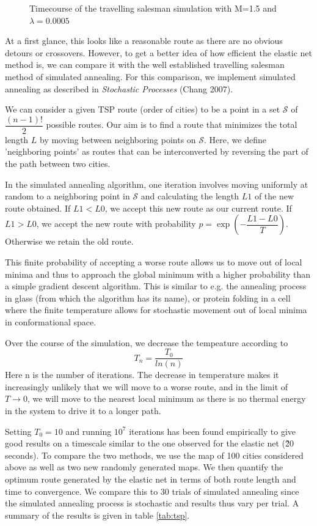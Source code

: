 \documentclass{article}
\begin{document}
\begin{figure}[h]
\begin{subfigure}[t]{0.24\linewidth}
		\label{fig:sim4}	
	\end{subfigure}%
\caption{Timecourse of the travelling salesman simulation with M=1.5 and $\lambda = 0.0005$}
\label{fig:tspsim}
\end{figure}

At a first glance, this looks like a reasonable route as there are no obvious detours or crossovers. However, to get a better idea of how efficient the elastic net method is, we can compare it with the well established travelling salesman method of simulated annealing. For this comparison, we implement simulated annealing as described in \textit{Stochastic Processes} (Chang 2007).

We can consider a given TSP route (order of cities) to be a point in a set $\mathcal{S}$ of $\dfrac{(n-1)!}{2}$ possible routes. Our aim is to find a route that minimizes the total length $L$ by moving between neighboring points on $\mathcal{S}$. Here, we define 'neighboring points' as routes that can be interconverted by reversing the part of the path between two cities.

In the simulated annealing algorithm, one iteration involves moving uniformly at random to a neighboring point in $\mathcal{S}$ and calculating the length $L1$ of the new route obtained.
If $L1 < L0$, we accept this new route as our current route.
If $L1 > L0$, we accept the new route with probability $p = \exp{(-\dfrac{L1-L0}{T})}$. Otherwise we retain the old route.

This finite probability of accepting a worse route allows us to move out of local minima and thus to approach the global minimum with a higher probability than a simple gradient descent algorithm. This is similar to e.g. the annealing process in glass (from which the algorithm has its name), or protein folding in a cell where the finite temperature allows for stochastic movement out of local minima in conformational space.

Over the course of the simulation, we decrease the tempeature according to 
\begin{equation}
T_n = \dfrac{T_0}{ln(n)}
\end{equation}
Here n is the number of iterations. The decrease in temperature makes it increasingly unlikely that we will move to a worse route, and in the limit of $T \rightarrow 0$, we will move to the nearest local minimum as there is no thermal energy in the system to drive it to a longer path.

Setting $T_0=10$ and running $10^7$ iterations has been found empirically to give good results on a timescale similar to the one observed for the elastic net (\~ 20 seconds).
To compare the two methods, we use the map of 100 cities considered above as well as two new randomly generated maps. We then quantify the optimum route generated by the elastic net in terms of both route length and time to convergence. We compare this to 30 trials of simulated annealing since the simulated annealing process is stochastic and results thus vary per trial. A summary of the results is given in table \ref{tab:tsp}.
\end{document}
